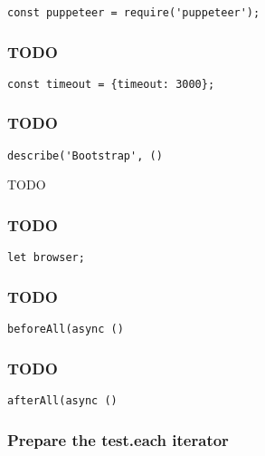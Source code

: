 \documentclass[a4paper]{article}
\begin{document}
\begin{lstlisting}
const puppeteer = require('puppeteer');
\end{lstlisting}

\hypertarget{toc473}{}
\subsubsection{TODO}

\begin{lstlisting}
const timeout = {timeout: 3000};
\end{lstlisting}

\hypertarget{toc474}{}
\subsubsection{TODO}

\begin{lstlisting}
describe('Bootstrap', ()
\end{lstlisting}

TODO

\hypertarget{toc475}{}
\subsubsection{TODO}

\begin{lstlisting}
let browser;
\end{lstlisting}

\hypertarget{toc476}{}
\subsubsection{TODO}

\begin{lstlisting}
beforeAll(async ()
\end{lstlisting}

\hypertarget{toc477}{}
\subsubsection{TODO}

\begin{lstlisting}
afterAll(async ()
\end{lstlisting}

\hypertarget{toc478}{}
\subsubsection{Prepare the test.each iterator}
\end{document}
